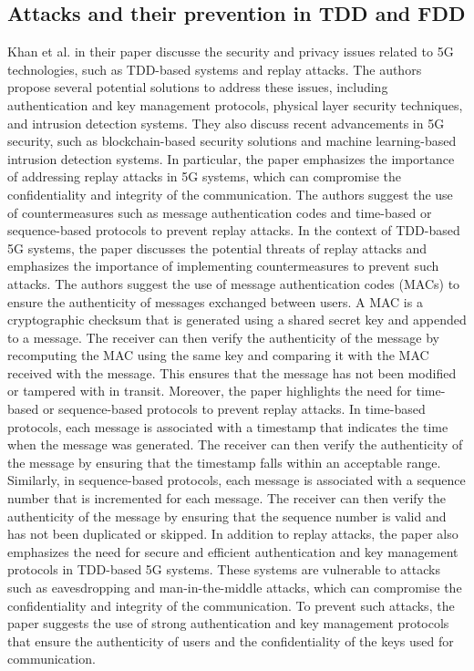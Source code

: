 \documentclass[conference]{IEEEtran}
\begin{document}
\subsection{Attacks and their prevention in TDD and FDD}
Khan et al. in their  paper discusse the security and privacy issues related to 5G technologies, such as TDD-based systems and replay attacks. The authors propose several potential solutions to address these issues, including authentication and key management protocols, physical layer security techniques, and intrusion detection systems. They also discuss recent advancements in 5G security, such as blockchain-based security solutions and machine learning-based intrusion detection systems.
In particular, the paper emphasizes the importance of addressing replay attacks in 5G systems, which can compromise the confidentiality and integrity of the communication. The authors suggest the use of countermeasures such as message authentication codes and time-based or sequence-based protocols to prevent replay attacks.
In the context of TDD-based 5G systems, the paper discusses the potential threats of replay attacks and emphasizes the importance of implementing countermeasures to prevent such attacks. The authors suggest the use of message authentication codes (MACs) to ensure the authenticity of messages exchanged between users. A MAC is a cryptographic checksum that is generated using a shared secret key and appended to a message. The receiver can then verify the authenticity of the message by recomputing the MAC using the same key and comparing it with the MAC received with the message. This ensures that the message has not been modified or tampered with in transit.
Moreover, the paper highlights the need for time-based or sequence-based protocols to prevent replay attacks. In time-based protocols, each message is associated with a timestamp that indicates the time when the message was generated. The receiver can then verify the authenticity of the message by ensuring that the timestamp falls within an acceptable range. Similarly, in sequence-based protocols, each message is associated with a sequence number that is incremented for each message. The receiver can then verify the authenticity of the message by ensuring that the sequence number is valid and has not been duplicated or skipped.
In addition to replay attacks, the paper also emphasizes the need for secure and efficient authentication and key management protocols in TDD-based 5G systems. These systems are vulnerable to attacks such as eavesdropping and man-in-the-middle attacks, which can compromise the confidentiality and integrity of the communication. To prevent such attacks, the paper suggests the use of strong authentication and key management protocols that ensure the authenticity of users and the confidentiality of the keys used for communication.
\end{document}
